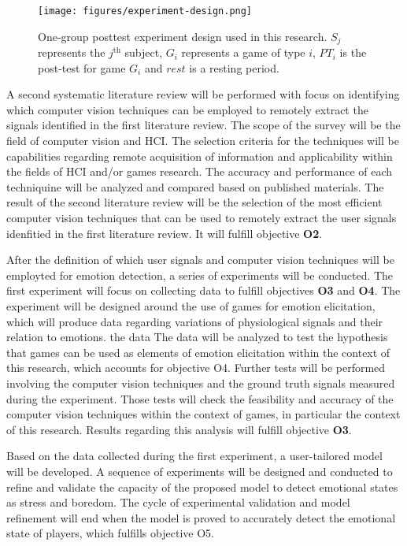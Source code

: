 \begin{figure}[ht]
    \centering
    \texttt{[image: figures/experiment-design.png]}
    \caption{One-group posttest experiment design used in this research. $S_j$ represents the $j^{\text{th}}$ subject, $G_i$ represents a game of type $i$, $PT_i$ is the post-test for game $G_i$ and $rest$ is a resting period.}
    \label{fig:research-process}
\end{figure}

A second systematic literature review will be performed with focus on identifying which computer vision techniques can be employed to remotely extract the signals identified in the first literature review. The scope of the survey will be the field of computer vision and HCI. The selection criteria for the techniques will be capabilities regarding remote acquisition of information and applicability within the fields of HCI and/or games research. The accuracy and performance of each techniquine will be analyzed and compared based on published materials. The result of the second literature review will be the selection of the most efficient computer vision techniques that can be used to remotely extract the user signals idenfitied in the first literature review. It will fulfill objective \textbf{O2}.

After the definition of which user signals and computer vision techniques will be employted for emotion detection, a series of experiments will be conducted. The first experiment will focus on collecting data to fulfill objectives \textbf{O3} and \textbf{O4}. The experiment will be designed around the use of games for emotion elicitation, which will produce data regarding variations of physiological signals and their relation to emotions. the data The data will be analyzed to test the hypothesis that games can be used as elements of emotion elicitation within the context of this research, which accounts for objective O4. Further tests will be performed involving the computer vision techniques and the ground truth signals measured during the experiment. Those tests will check the feasibility and accuracy of the computer vision techniques within the context of games, in particular the context of this research. Results regarding this analysis will fulfill objective \textbf{O3}.

Based on the data collected during the first experiment, a user-tailored model will be developed. A sequence of experiments will be designed and conducted to refine and validate the capacity of the proposed model to detect emotional states as stress and boredom. The cycle of experimental validation and model refinement will end when the model is proved to accurately detect the emotional state of players, which fulfills objective O5.

